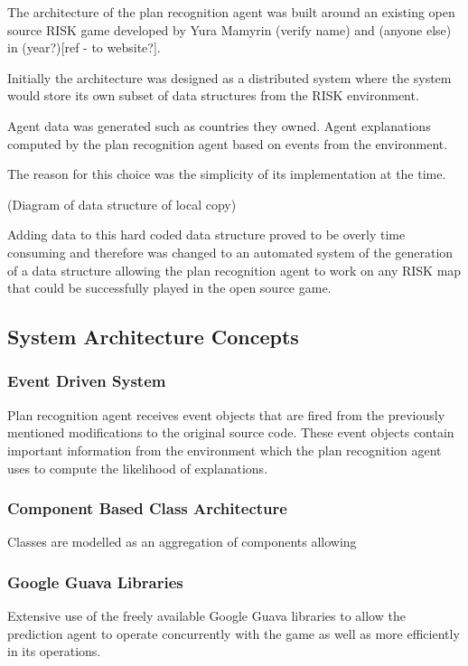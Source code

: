 \documentclass[parskip]{cs4rep}
\begin{document}
The architecture of the plan recognition agent was built around an existing open source RISK game developed by Yura Mamyrin (verify name) and (anyone else) in (year?)[ref - to website?].

Initially the architecture was designed as a distributed system where the system would store its own subset of data structures from the RISK environment.

Agent data was generated such as countries they owned.
Agent explanations computed by the plan recognition agent based on events from the environment.

The reason for this choice was the simplicity of its implementation at the time.

(Diagram of data structure of local copy)

Adding data to this hard coded data structure proved to be overly time consuming and therefore was changed to an automated system of the generation of a data structure allowing the plan recognition agent to work on any RISK map that could be successfully played in the open source game.

\subsection{System Architecture Concepts}

\subsubsection{Event Driven System}

Plan recognition agent receives event objects that are fired from the previously mentioned modifications to the original source code. These event objects contain important information from the environment which the plan recognition agent uses to compute the likelihood of explanations.

\subsubsection{Component Based Class Architecture}

Classes are modelled as an aggregation of components allowing

\subsubsection{Google Guava Libraries}

Extensive use of the freely available Google Guava libraries to allow the prediction agent to operate concurrently with the game as well as more efficiently in its operations.
\end{document}
